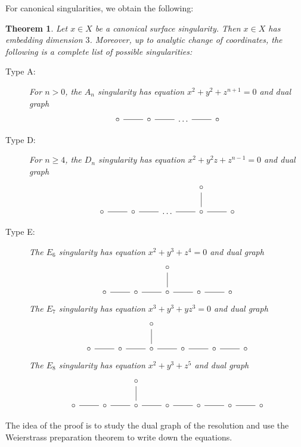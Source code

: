 \documentclass[leqno, openany]{memoir}
\newtheorem{thm}{Theorem}[section]
\theoremstyle{definition}
\theoremstyle{remark}
\theoremstyle{plain}
\theoremstyle{definition}
\theoremstyle{remark}
\begin{document}
For canonical singularities, we obtain the following:
\begin{thm}
    Let $x \in X$ be a canonical surface singularity. Then $x \in X$ has embedding dimension $3$. Moreover, up to analytic change of coordinates, the following is a complete list of possible singularities:
    \begin{description}
        \item[Type A:] For $n > 0$, the $A_n$ singularity has equation $x^2 + y^2 + z^{n+1} = 0$ and dual graph
            \begin{equation*}
            \begin{tikzcd}
                \circ \ar[-]{r} & \circ \ar[-]{r} & \ldots \ar[-]{r} & \circ
            \end{tikzcd}
            \end{equation*}
        \item[Type D:] For $n \geq 4$, the $D_n$ singularity has equation $x^2 + y^2z + z^{n-1} = 0$ and dual graph
            \begin{equation*}
            \begin{tikzcd}
                & & & \circ \ar[-]{d} \\
                \circ \ar[-]{r} & \circ \ar[-]{r} & \ldots \ar[-]{r} & \circ \ar[-]{r} & \circ
            \end{tikzcd}
            \end{equation*}
        \item[Type E:] The $E_6$ singularity has equation $x^2 + y^3 + z^4 = 0$ and dual graph
            \begin{equation*}
            \begin{tikzcd}
                & & \circ \ar[-]{d} \\
                \circ \ar[-]{r} & \circ \ar[-]{r} & \circ \ar[-]{r} & \circ \ar[-]{r} & \circ
            \end{tikzcd}
            \end{equation*}
            The $E_7$ singularity has equation $x^3 + y^3 + yz^3 = 0$ and dual graph
            \begin{equation*}
            \begin{tikzcd}
                & & \circ \ar[-]{d} \\
                \circ \ar[-]{r} & \circ \ar[-]{r} & \circ \ar[-]{r} & \circ \ar[-]{r} & \circ \ar[-]{r} & \circ
            \end{tikzcd}
            \end{equation*}
            The $E_8$ singularity has equation $x^2 + y^3 + z^5$ and dual graph
            \begin{equation*}
            \begin{tikzcd}
                & & \circ \ar[-]{d} \\
                \circ \ar[-]{r} & \circ \ar[-]{r} & \circ \ar[-]{r} & \circ \ar[-]{r} & \circ \ar[-]{r} & \circ \ar[-]{r} & \circ
            \end{tikzcd}
            \end{equation*}
    \end{description}
\end{thm}

The idea of the proof is to study the dual graph of the resolution and use the Weierstrass preparation theorem to write down the equations.
\end{document}
